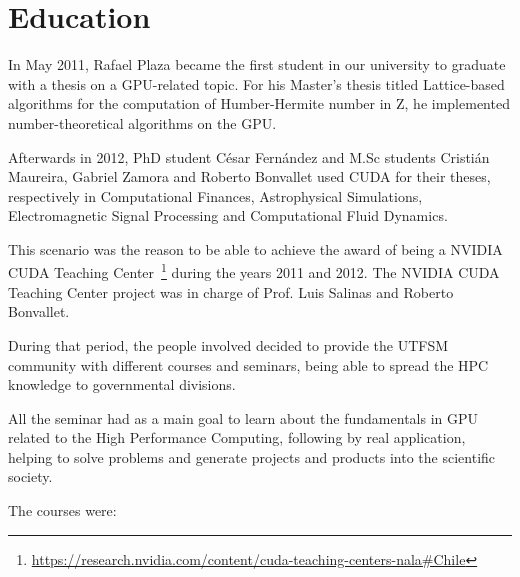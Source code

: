 \section{Education}

In May 2011, Rafael Plaza became the first student in our university
to graduate with a thesis on a GPU-related topic.
For his Master's thesis titled Lattice-based algorithms for the computation of
Humber-Hermite number in Z, he implemented number-theoretical algorithms on the GPU.

Afterwards in 2012, PhD student César Fernández and M.Sc students Cristián Maureira,
Gabriel Zamora and Roberto Bonvallet used CUDA for their theses,
respectively in Computational Finances, Astrophysical Simulations,
Electromagnetic Signal Processing and Computational Fluid Dynamics.

This scenario was the reason to be able to achieve the award of being a
NVIDIA CUDA Teaching Center~\footnote{\url{https://research.nvidia.com/content/cuda-teaching-centers-nala\#Chile}} during the years 2011 and 2012.
The NVIDIA CUDA Teaching Center project was in charge of Prof. Luis Salinas
and Roberto Bonvallet.

During that period,
the people involved decided to provide the UTFSM community
with different courses and seminars, being able to spread the HPC knowledge
to governmental divisions.

All the seminar had as a main goal to learn about the fundamentals in GPU related
to the High Performance Computing, following by real application,
helping to solve problems and generate projects and products into the
scientific society.

The courses were:

